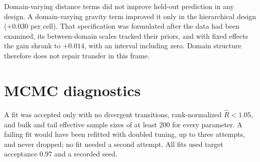 \documentclass[11pt]{article}
\begin{document}
Domain-varying distance terms did not improve held-out prediction in any design. A domain-varying gravity term improved it only in the hierarchical design ($+0.030$ per cell). That specification was formulated after the data had been examined, its between-domain scales tracked their priors, and with fixed effects the gain shrank to $+0.014$, with an interval including zero. Domain structure therefore does not repair transfer in this frame.

\begin{table}[ht]
\centering
\small
\caption{Held-out log-score gain from adding domain-varying terms, with 95\% spatial-block bootstrap intervals and the number of held-out sectors in which the log score improved. $^{\dagger}$Specification suggested by the data; between-domain scales were prior-dependent.}
\label{tab:s8}
\resizebox{\textwidth}{!}{}
\end{table}

\section{MCMC diagnostics}
\label{sec:s8}

A fit was accepted only with no divergent transitions, rank-normalized $\hat R<1.05$, and bulk and tail effective sample sizes of at least 200 for every parameter. A failing fit would have been refitted with doubled tuning, up to three attempts, and never dropped; no fit needed a second attempt. All fits used target acceptance 0.97 and a recorded seed.

\begin{table}[ht]
\centering
\small
\caption{Convergence diagnostics of all 102 fits.}
\label{tab:s9}
\resizebox{\textwidth}{!}{}
\end{table}
\end{document}

